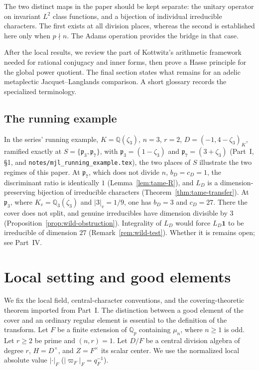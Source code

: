 \documentclass[11pt]{article}
\theoremstyle{plain}
\theoremstyle{definition}
\begin{document}
The two distinct maps in the paper should be kept separate:
the unitary operator on invariant $L^2$ class functions, and a
bijection of individual irreducible characters. The first exists at
all division places, whereas the second is established here only
when $p\nmid n$. The Adams operation provides the bridge in that case.

After the local results, we review the part of Kottwitz's arithmetic
framework needed for rational conjugacy and inner forms, then prove
a Hasse principle for the global power quotient. The final section
states what remains for an adelic metaplectic Jacquet--Langlands
comparison. A short glossary records the specialized terminology.

\subsection*{The running example}
In the series' running example, $K=\mathbb{Q}(\zeta_3)$, $n=3$, $r=2$, $D=(-1,4-\zeta_3)_K$, ramified exactly at $S=\{\mathfrak p_3,\mathfrak p_7\}$, with $\mathfrak p_3=(1-\zeta_3)$ and $\mathfrak p_7=(3+\zeta_3)$ (Part~I, \S1, and \texttt{notes/mjl\_running\_example.tex}), the two places of $S$ illustrate the two regimes of this paper. At $\mathfrak p_7$, which does not divide $n$, $b_D=c_D=1$, the discriminant ratio is identically $1$ (Lemma~\ref{lem:tame-R}), and $L_D$ is a dimension-preserving bijection of irreducible characters (Theorem~\ref{thm:tame-transfer}). At $\mathfrak p_3$, where $K_v=\mathbb{Q}_3(\zeta_3)$ and $|3|_v=1/9$, one has $b_D=3$ and $c_D=27$. There the cover does not split, and genuine irreducibles have dimension divisible by $3$ (Proposition~\ref{prop:wild-obstruction}). Integrality of $L_D$ would force $L_D\mathbf 1$ to be irreducible of dimension $27$ (Remark~\ref{rem:wild-test}). Whether it is remains open; see Part~IV.

\section{Local setting and good elements}
We fix the local field, central-character conventions, and the
covering-theoretic theorem imported from Part~I. The distinction
between a good element of the cover and an ordinary regular element
is essential to the definition of the transform.
Let $F$ be a finite extension of $\mathbb Q_p$ containing $\mu_n$, where $n\ge1$ is odd. Let $r\ge2$ be prime and $(n,r)=1$. Let $D/F$ be a central division algebra of degree $r$, $H=D^\times$, and $Z=F^\times$ its scalar center. We use the normalized local absolute value $|\cdot|_F$ ($|\varpi_F|_F=q_F^{-1}$).
\end{document}

